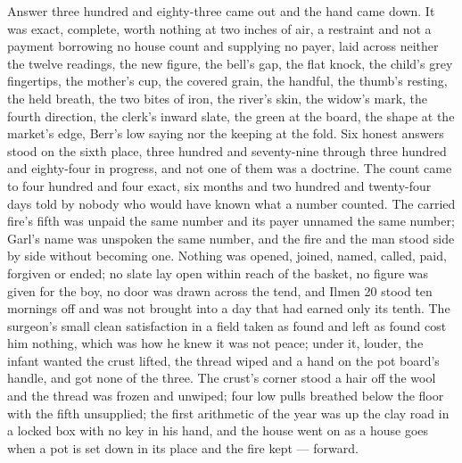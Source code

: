 Answer three hundred and eighty-three came out and the hand came down. It was exact, complete, worth nothing at two inches of air, a restraint and not a payment borrowing no house count and supplying no payer, laid across neither the twelve readings, the new figure, the bell's gap, the flat knock, the child's grey fingertips, the mother's cup, the covered grain, the handful, the thumb's resting, the held breath, the two bites of iron, the river's skin, the widow's mark, the fourth direction, the clerk's inward slate, the green at the board, the shape at the market's edge, Berr's low saying nor the keeping at the fold. Six honest answers stood on the sixth place, three hundred and seventy-nine through three hundred and eighty-four in progress, and not one of them was a doctrine. The count came to four hundred and four exact, six months and two hundred and twenty-four days told by nobody who would have known what a number counted. The carried fire's fifth was unpaid the same number and its payer unnamed the same number; Garl's name was unspoken the same number, and the fire and the man stood side by side without becoming one. Nothing was opened, joined, named, called, paid, forgiven or ended; no slate lay open within reach of the basket, no figure was given for the boy, no door was drawn across the tend, and Ilmen 20 stood ten mornings off and was not brought into a day that had earned only its tenth. The surgeon's small clean satisfaction in a field taken as found and left as found cost him nothing, which was how he knew it was not peace; under it, louder, the infant wanted the crust lifted, the thread wiped and a hand on the pot board's handle, and got none of the three. The crust's corner stood a hair off the wool and the thread was frozen and unwiped; four low pulls breathed below the floor with the fifth unsupplied; the first arithmetic of the year was up the clay road in a locked box with no key in his hand, and the house went on as a house goes when a pot is set down in its place and the fire kept --- forward.
